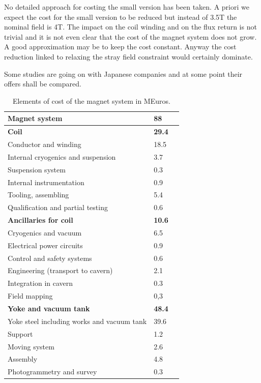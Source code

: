 No detailed approach for costing the small version has been taken. A priori we expect the cost for the small version to be reduced but instead of 3.5T the nominal field is 4T. The impact on the coil winding and on the flux return is not trivial and it is not even clear that the cost of the magnet system does not grow.
A good approximation may be to keep the cost constant. Anyway the cost reduction linked to relaxing the stray field constraint would certainly dominate.

Some studies are going on with Japanese companies and at some point their offers shall be compared.
\begin{table}\hspace*{-0cm}\small 
\begin{tabular}[h!]{ l p{0.2\hsize}  p{0.1\hsize} }
\toprule
\textbf{Magnet system} & \textbf{88}\\
\midrule
\textbf{Coil} & \textbf{29.4}\\
\midrule
Conductor and winding & 18.5\\
Internal cryogenics and suspension &  3.7\\
Suspension system & 0.3 \\
Internal instrumentation & 0.9 \\
Tooling, assembling & 5.4 \\
Qualification and partial testing & 0.6\\
\midrule
\textbf{Ancillaries for coil} & \textbf{10.6}\\
\midrule
Cryogenics and vacuum & 6.5\\
Electrical power circuits & 0.9\\
Control and safety systems& 0.6 \\
Engineering (transport to cavern) & 2.1\\
Integration in cavern& 0.3 \\
Field mapping&0,3\\
\midrule
\textbf{Yoke and vacuum tank} & \textbf{48.4}\\
\midrule
Yoke steel including works and vacuum tank& 39.6\\
Support &1.2\\
Moving system& 2.6\\
Assembly& 4.8\\
Photogrammetry and survey& 0.3 \\
\bottomrule
\end{tabular}
\caption{\label{magnet_cost}Elements of cost of the magnet system in MEuros.}
\end{table}

